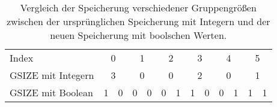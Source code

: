 \begin{table}[H]
\begin{tabular}{l|cc|cc|cc|cc|cc|cc}
Index              & \multicolumn{2}{c|}{0} & \multicolumn{2}{c|}{1} & \multicolumn{2}{c|}{2} & \multicolumn{2}{c|}{3} & \multicolumn{2}{c|}{4} & \multicolumn{2}{c}{5} \\
GSIZE mit Integern & \multicolumn{2}{c|}{3} & \multicolumn{2}{c|}{0} & \multicolumn{2}{c|}{0} & \multicolumn{2}{c|}{2} & \multicolumn{2}{c|}{0} & \multicolumn{2}{c}{1} \\
GSIZE mit Boolean  & 1          & 0         & 0          & 0         & 0          & 1         & 1          & 0         & 0          & 1         & 1         & 1        
\end{tabular}
\caption{Vergleich der Speicherung verschiedener Gruppengr{\"o}{\ss}en zwischen der urspr{\"u}nglichen Speicherung mit Integern und der neuen Speicherung mit boolschen Werten. }
\label{compare_gsize_variants}
\end{table}